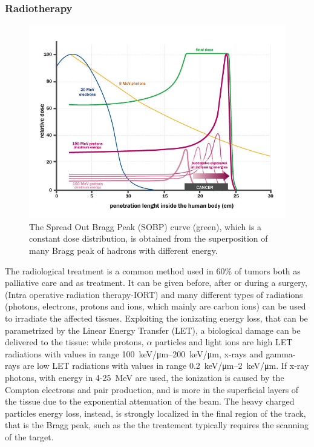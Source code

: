         \subsubsection{Radiotherapy}
            \begin{figure}
                \centering
                \includegraphics[width=.7\linewidth]{figures/pixel_detectors_usage/Bragg-Peak.png}
                \caption{The Spread Out Bragg Peak (SOBP) curve (green), which is a constant dose distribution, is obtained from the superposition of many Bragg peak of hadrons with different energy.}
                \label{fig:Bragg-peak}
            \end{figure}
            The radiological treatment is a common method used in 60\% of tumors both as palliative care and as treatment. It can be given before, after or during a surgery, (Intra operative radiation therapy-IORT) and many different types of radiations (photons, electrons, protons and ions, which mainly are carbon ions) can be used to irradiate the affected tissues.
            Exploiting the ionizating energy loss, that can be parametrized by the Linear Energy Transfer (LET), a biological damage can be delivered to the tissue: while protons, $\alpha$ particles and light ions are high LET radiations with values in range \SIrange{100}{200}{keV/\um}, x-rays and gamma-rays are low LET radiations with values in range \SIrange{0.2}{2}{keV/\um}.
            If x-ray photons, with energy in 4-\SI{25}{MeV} are used, the ionization is caused by the Compton electrons and pair production, and is more in the superficial layers of the tissue due to the exponential attenuation of the beam. 
            The heavy charged particles energy loss, instead, is strongly localized in the final region of the track, that is the Bragg peak, such as the the treatement typically requires the scanning of the target.
            
